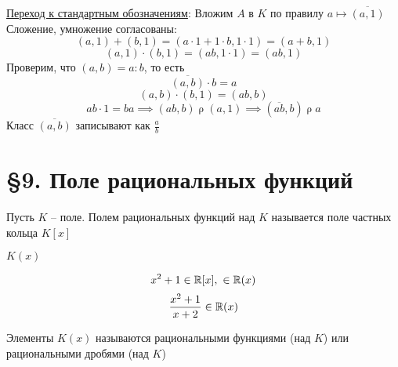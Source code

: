 \underline{Переход к стандартным обозначениям}:
Вложим $A$ в $K$ по правилу $a \mapsto \overline{(a,1)}$ \\
Сложение, умножение согласованы:
$$ (a,1) + (b,1) = (a \cdot 1 + 1 \cdot b, 1 \cdot 1) = (a + b, 1) $$
$$ (a,1) \cdot (b,1) = (ab, 1 \cdot 1) = (ab,1) $$
Проверим, что $(a,b) = a : b $, то есть
$$ \overline{(a,b)} \cdot b = a $$
$$ (a,b) \cdot (b, 1) = (ab, b) $$
$$ ab \cdot 1 = ba \implies (ab, b) \mathrel\rho (a,1) \implies (\overline{ab}, b) \mathrel\rho a $$
Класс $\overline{(a,b)} $ записывают как $\frac{a}b $

\section{\S9. Поле рациональных функций}

\begin{definition}
    Пусть $K$ -- поле. Полем рациональных функций над $K$ называется поле частных кольца $K[x]$
\end{definition}

\begin{notation}
	$K(x)$
\end{notation}

\begin{eg}
    $$ x^2 + 1 \in \mathbb{R}[x], ~ \in \mathbb{R}(x) $$
    $$ \frac{x^2 + 1}{x+2} \in \mathbb{R}(x) $$
\end{eg}

\begin{definition}
	Элементы $K(x)$ называются рациональными функциями (над $K$) или рациональными дробями (над $K$)
\end{definition}

